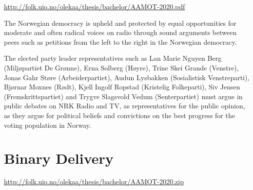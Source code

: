 \documentclass[a4paper,norsk,utf8]{report}
\begin{document}
\url{http://folk.uio.no/olekaa/thesis/bachelor/AAMOT-2020.pdf}

The Norwegian democracy is upheld and protected by equal opportunities for 
moderate and often radical voices on radio through sound arguments between 
peers such as petitions from the left to the right in the Norwegian democracy.

The elected party leader representatives such as Lan Marie Nguyen Berg (Miljøpartiet De Grønne), Erna Solberg (Høyre), Trine Skei Grande (Venstre), Jonas Gahr Støre (Arbeiderpartiet), Audun Lysbakken (Sosialistisk Venstreparti), Bjørnar Moxnes (Rødt), Kjell Ingolf Ropstad (Kristelig Folkeparti), Siv Jensen (Fremskrittspartiet) and Trygve Slagsvold Vedum (Senterpartiet) must argue in public debates on NRK Radio and TV, as representatives for the public opinion, as they argue for political beliefs and convictions on the best progress for the voting population in Norway.

\part{Binary Delivery}

\url{http://folk.uio.no/olekaa/thesis/bachelor/AAMOT-2020.zip}
 
\printindex
\end{document}
